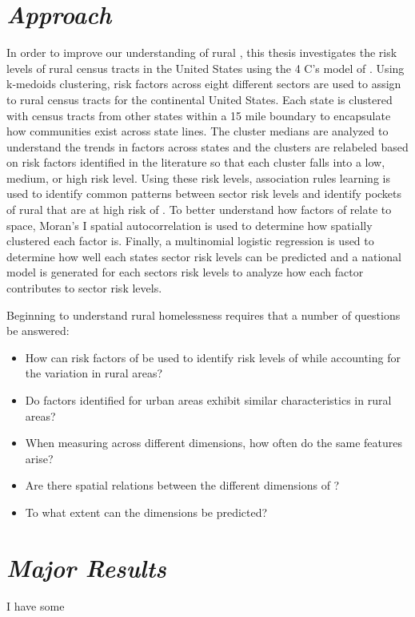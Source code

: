 \section{\textit{Approach}}
In order to improve our understanding of rural \hs, this thesis investigates the risk levels of rural census tracts in the United States  using the 4 C's model of \hs. Using k-medoids clustering, risk factors across eight different sectors are used to assign \HIRLs to rural census tracts for the continental United States. Each state is clustered with census tracts from other states within a 15 mile boundary to encapsulate how communities exist across state lines. The cluster medians are analyzed to understand the trends in \hs factors across states and the clusters are relabeled based on risk factors identified in the literature so that each cluster falls into a low, medium, or high risk level. Using these risk levels, association rules learning is used to identify common patterns between sector risk levels and identify pockets of rural \ct that are at high risk of \hs. To better understand how factors of \hs relate to space, Moran's I spatial autocorrelation is used to determine how spatially clustered each \hs factor is. Finally, a multinomial logistic regression is used to determine how well each states sector risk levels can be predicted and a national model is generated for each sectors risk levels to analyze how each \hs factor contributes to sector risk levels. 

Beginning to understand rural homelessness requires that a number of questions be answered:
\begin{itemize}
    \item How can risk factors of  be used to identify risk levels of \hs while accounting for the variation in rural areas? 
    \item Do \hs factors identified for urban areas exhibit similar characteristics in rural areas? 
    \item When measuring \hs across different dimensions, how often do the same features arise?
    \item Are there spatial relations between the different dimensions of \hs? 
    \item To what extent can the \hs dimensions be predicted? 

\end{itemize}
\section{\textit{Major Results}}
I have some

